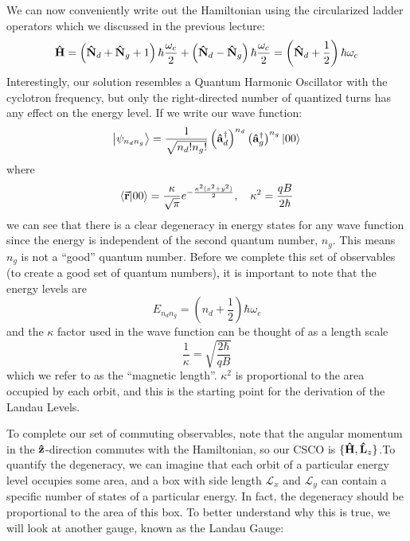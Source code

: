 \documentclass[a4paper,twoside,master.tex]{subfiles}
\begin{document}
We can now conveniently write out the Hamiltonian using the circularized ladder operators which we discussed in the previous lecture:
\begin{equation}
    \vu{H} = \left( \vu{N}_d + \vu{N}_g + 1 \right) \hbar \frac{\omega_c}{2} + \left( \vu{N}_d - \vu{N}_g \right) \hbar \frac{\omega_c}{2} = \left( \vu{N}_d + \frac{1}{2} \right) \hbar \omega_c
\end{equation}
Interestingly, our solution resembles a Quantum Harmonic Oscillator with the cyclotron frequency, but only the right-directed number of quantized turns has any effect on the energy level. If we write our wave function:
\begin{equation}
    \ket{\psi_{n_d n_g}} = \frac{1}{\sqrt{n_d! n_g!}} \left( \vu{a}_d^\dagger \right)^{n_d} \left( \vu{a}_g^\dagger \right)^{n_g}\ket{00}
\end{equation}
where
\begin{equation}
    \bra{ \va{r}}\ket{00} = \frac{\kappa}{\sqrt{\pi}} e^{- \frac{\kappa^2 (x^2 + y^2)}{2}},\quad \kappa^2 = \frac{qB}{2 \hbar}
\end{equation}
we can see that there is a clear degeneracy in energy states for any wave function since the energy is independent of the second quantum number, $ n_g $. This means $ n_g $ is not a ``good'' quantum number. Before we complete this set of observables (to create a good set of quantum numbers), it is important to note that the energy levels are
\begin{equation}
    E_{n_d n_g} = \left( n_d + \frac{1}{2} \right) \hbar \omega_c
\end{equation}
and the $\kappa$ factor used in the wave function can be thought of as a length scale
\begin{equation}
    \frac{1}{\kappa} = \sqrt{\frac{2 \hbar}{qB}}
\end{equation}
which we refer to as the ``magnetic length''. $ \kappa^2 $ is proportional to the area occupied by each orbit, and this is the starting point for the derivation of the Landau Levels.

To complete our set of commuting observables, note that the angular momentum in the $ \vu{z} $-direction commutes with the Hamiltonian, so our CSCO is $ \{ \vu{H}, \vu{L}_z\} $.To quantify the degeneracy, we can imagine that each orbit of a particular energy level occupies some area, and a box with side length $ \mathcal{L}_x $ and $ \mathcal{L}_y $ can contain a specific number of states of a particular energy. In fact, the degeneracy should be proportional to the area of this box. To better understand why this is true, we will look at another gauge, known as the Landau Gauge:
\end{document}
